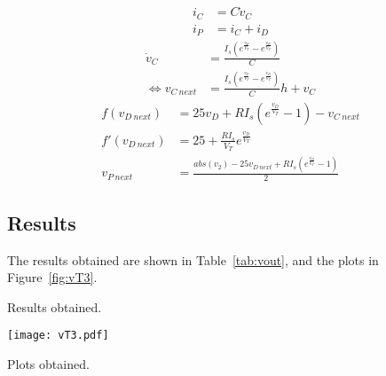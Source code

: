 \begin{align}\label{step2}
  i_C &= C\dot{v}_C\\
  i_P &= i_C + i_D
\end{align}
\vspace{-15pt}
\begin{equation}
\begin{split}
  \dot{v}_C &= \frac{I_s(e^{\frac{v_P}{V_T}}-e^{\frac{v_D}{V_T}})}{C}\\
  \Leftrightarrow v_{C\ next} &= \frac{I_s(e^{\frac{v_P}{V_T}}-e^{\frac{v_D}{V_T}})}{C}h + v_C
\end{split}
\end{equation}
\vspace{-15pt}
\begin{align}
  f(v_{D\ next})&=25v_D + RI_s(e^{\frac{v_D}{V_T}}-1) - v_{C\ next}\\
  f'(v_{D\ next})&=25 + \frac{RI_s}{V_T}e^{\frac{v_D}{V_T}}\\
  v_{P\ next} &= \frac{abs(v_2) - 25v_{D\ next} + RI_s(e^{\frac{v_D}{V_T}}-1)}{2}
\end{align}



\subsection{Results}
The results obtained are shown in Table~\ref{tab:vout}, and the plots in
Figure~\ref{fig:vT3}.\\

\begin{minipage}[b]{0.48\textwidth}
  \centering
  
  \captionsetup{type=table}
  \caption{Results obtained.}
  \label{tab:vout}
\end{minipage}
\hfil
\begin{minipage}[b]{0.48\textwidth}
  \centering
  \texttt{[image: vT3.pdf]}
  \captionsetup{type=figure}
  \caption{Plots obtained.}
  \label{fig:vT3}
\end{minipage}
